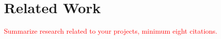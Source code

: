 \section{Related Work}
\label{sec:related} 

\textcolor{red}{Summarize research related to your projects, minimum eight citations. }